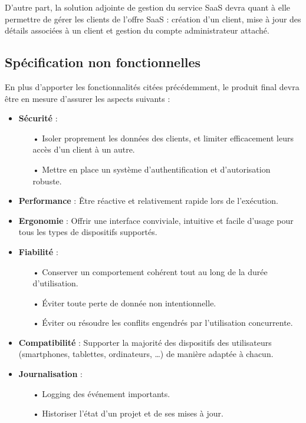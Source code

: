 \begin{spacing}{1.5}
D'autre part, la solution adjointe de gestion du service SaaS devra quant à elle permettre de gérer les clients de l'offre SaaS : création d’un client, mise à jour des détails associées à un client et gestion du compte administrateur attaché.

\subsection{Spécification non fonctionnelles}
En plus d’apporter les fonctionnalités citées précédemment, le produit final devra être en mesure d'assurer les aspects suivants :
\begin{itemize}
    \item \textbf{Sécurité} :
        \begin{itemize}
            \item[•] Isoler proprement les données des clients, et limiter efficacement leurs accès d'un client à un autre.
            \item[•] Mettre en place un système d’authentification et d’autorisation robuste.
        \end{itemize}
    \item \textbf{Performance} : Être réactive et relativement rapide lors de l'exécution.
    \item \textbf{Ergonomie} : Offrir une interface conviviale, intuitive et facile d’usage pour tous les types de dispositifs supportés.
    \item \textbf{Fiabilité} :
        \begin{itemize}
            \item[•] Conserver un comportement cohérent tout au long de la durée d'utilisation.
            \item[•] Éviter toute perte de donnée non intentionnelle.
            \item[•] Éviter ou résoudre les conflits engendrés par l’utilisation concurrente.
        \end{itemize}
    \item \textbf{Compatibilité} : Supporter la majorité des dispositifs des utilisateurs (smartphones, tablettes, ordinateurs, …) de manière adaptée à chacun.
    \item \textbf{Journalisation} :
        \begin{itemize}
            \item[•] Logging des événement importants.
            \item[•] Historiser l'état d'un projet et de ses mises à jour.
        \end{itemize}
\end{itemize}


\end{spacing}
